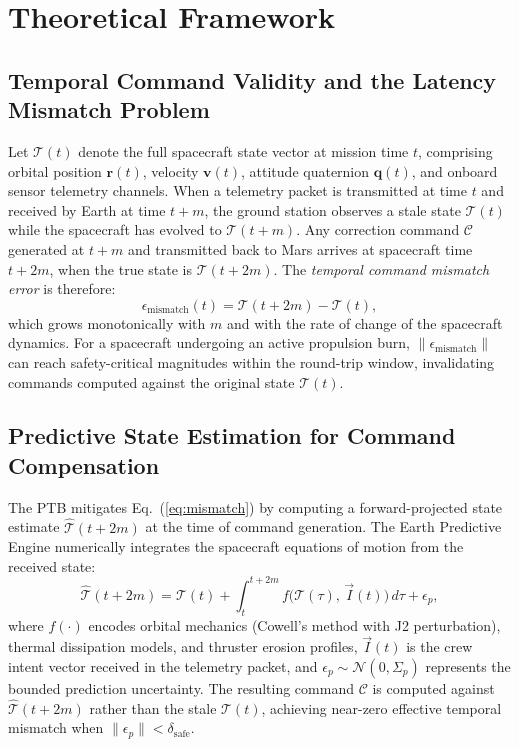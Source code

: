 \documentclass[ASNA,twocolumn]{USG}
\begin{document}
\section{Theoretical Framework}

\subsection{Temporal Command Validity and the Latency Mismatch Problem}

Let \(\mathcal{T}(t)\) denote the full spacecraft state vector at mission time \(t\),
comprising orbital position \(\mathbf{r}(t)\), velocity \(\mathbf{v}(t)\), attitude
quaternion \(\mathbf{q}(t)\), and onboard sensor telemetry channels. When a telemetry
packet is transmitted at time \(t\) and received by Earth at time \(t+m\), the ground station
observes a stale state \(\mathcal{T}(t)\) while the spacecraft has evolved to \(\mathcal{T}(t+m)\).
Any correction command \(\mathcal{C}\) generated at \(t+m\) and transmitted back to Mars
arrives at spacecraft time \(t+2m\), when the true state is \(\mathcal{T}(t+2m)\).
The \textit{temporal command mismatch error} is therefore:
\begin{equation}
  \epsilon_{\text{mismatch}}(t) = \mathcal{T}(t+2m) - \mathcal{T}(t),
  \label{eq:mismatch}
\end{equation}
which grows monotonically with \(m\) and with the rate of change of the spacecraft dynamics.
For a spacecraft undergoing an active propulsion burn, \(\|\epsilon_{\text{mismatch}}\|\)
can reach safety-critical magnitudes within the round-trip window, invalidating commands
computed against the original state \(\mathcal{T}(t)\).

\subsection{Predictive State Estimation for Command Compensation}

The PTB mitigates Eq.~(\ref{eq:mismatch}) by computing a forward-projected state estimate
\(\hat{\mathcal{T}}(t+2m)\) at the time of command generation. The Earth Predictive Engine
numerically integrates the spacecraft equations of motion from the received state:
\begin{equation}
  \hat{\mathcal{T}}(t+2m) = \mathcal{T}(t)
    + \int_{t}^{t+2m} f\!\bigl(\mathcal{T}(\tau),\,\vec{I}(t)\bigr)\,d\tau + \epsilon_p,
\end{equation}
where \(f(\cdot)\) encodes orbital mechanics (Cowell's method with J2 perturbation),
thermal dissipation models, and thruster erosion profiles, \(\vec{I}(t)\) is the crew
intent vector received in the telemetry packet, and \(\epsilon_p \sim \mathcal{N}(0,\Sigma_p)\)
represents the bounded prediction uncertainty. The resulting command \(\mathcal{C}\) is
computed against \(\hat{\mathcal{T}}(t+2m)\) rather than the stale \(\mathcal{T}(t)\),
achieving near-zero effective temporal mismatch when \(\|\epsilon_p\| < \delta_\text{safe}\).
\end{document}
